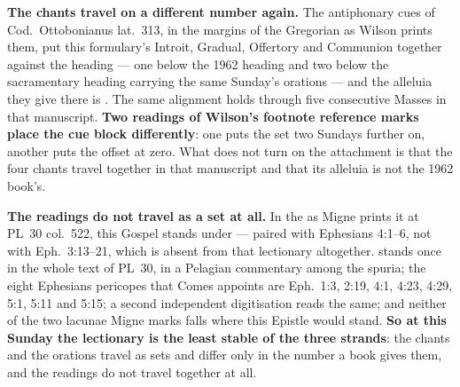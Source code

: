 \textbf{The chants travel on a different number again.} The antiphonary cues of
Cod.~Ottobonianus lat.~313, in the margins of the Gregorian as Wilson prints
them, put this formulary's Introit, Gradual, Offertory and Communion together
against the heading  --- one below the 1962
heading and two below the sacramentary heading carrying the same Sunday's
orations --- and the alleluia they give there is . The
same alignment holds through five consecutive Masses in that manuscript.
\textbf{Two readings of Wilson's footnote reference marks place the cue block
differently}: one puts the set two Sundays further on, another puts the offset at
zero. What does not turn on the attachment is that the four chants travel
together in that manuscript and that its alleluia is not the 1962 book's.

\textbf{The readings do not travel as a set at all.} In the 
as Migne prints it at PL~30 col.~522, this
Gospel stands under  --- paired with Ephesians
4:1--6, not with Eph.~3:13--21, which is absent from that lectionary
altogether.  stands once in the whole text of PL~30,
in a Pelagian commentary among the spuria; the eight Ephesians pericopes that
Comes appoints are Eph.~1:3, 2:19, 4:1, 4:23, 4:29, 5:1, 5:11 and 5:15; a
second independent digitisation reads the same; and neither of the two lacunae
Migne marks falls where this Epistle would stand. \textbf{So at this Sunday the
lectionary is the least stable of the three strands}: the chants and the
orations travel as sets and differ only in the number a book gives them, and
the readings do not travel together at all.

